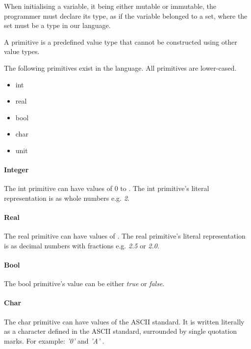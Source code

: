 When initialising a variable, it being either mutable or immutable, the programmer must declare its type, as if the variable belonged to a set, where the set must be a type in our language.

A primitive is a predefined value type that cannot be constructed using other value types.

The following primitives exist in the language. All primitives are lower-cased.

\begin{itemize}
  \item int
  \item real
  \item bool
  \item char
  \item unit
\end{itemize}

\paragraph{Integer}
\label{subsubsec:int}

The int primitive can have values of 0 to . The int primitive's literal representation is as whole numbers e.g. \emph{2}.

\paragraph{Real}
\label{subsubsec:real}

The real primitive can have values of . The real primitive's literal representation is as decimal numbers with fractions e.g. \emph{2.5} or \emph{2.0}.

\paragraph{Bool}
\label{subsubsec:bool}

The bool primitive's value can be either \emph{true} or \emph{false}.

\paragraph{Char}
\label{sec:char}

The char primitive can have values of the ASCII standard. It is written literally as a character defined in the ASCII standard, surrounded by single quotation marks. For example: \emph{ '0' } and \emph{ 'A' }.

